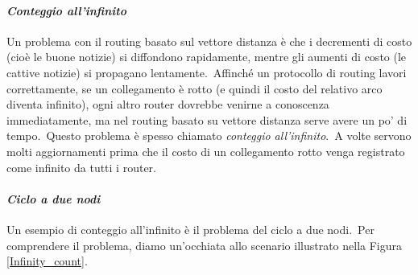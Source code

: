 \paragraph{\emph{Conteggio all'infinito}}

Un problema con il routing basato sul vettore distanza è che i decrementi di costo (cioè le buone notizie) si diffondono rapidamente, mentre gli aumenti di costo (le cattive notizie) si propagano lentamente.\
Affinché un protocollo di routing lavori correttamente, se un collegamento è rotto (e quindi il costo del relativo arco diventa infinito), ogni altro router dovrebbe venirne a conoscenza immediatamente, ma nel routing basato su vettore distanza serve avere un po' di tempo.\
Questo problema è spesso chiamato \emph{conteggio all'infinito}.\
A volte servono molti aggiornamenti prima che il costo di un collegamento rotto venga registrato come infinito da tutti i router.

\paragraph{\emph{Ciclo a due nodi}}

Un esempio di conteggio all'infinito è il problema del ciclo a due nodi.\
Per comprendere il problema, diamo un'occhiata allo scenario illustrato nella Figura \ref{Infinity_count}.

